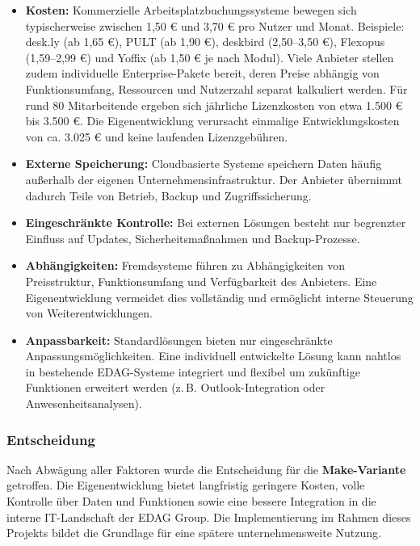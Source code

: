 \documentclass[11pt,a4paper]{report}
\begin{document}
\begin{itemize}
    \item \textbf{Kosten:} 
          Kommerzielle Arbeitsplatzbuchungssysteme bewegen sich typischerweise 
          zwischen 1,50 € und 3,70 € pro Nutzer und Monat.  
          Beispiele: desk.ly (ab 1,65 €), PULT (ab 1,90 €), deskbird (2,50–3,50 €), 
          Flexopus (1,59–2,99 €) und Yoffix (ab 1,50 € je nach Modul).  
          Viele Anbieter stellen zudem individuelle Enterprise-Pakete bereit, deren Preise 
          abhängig von Funktionsumfang, Ressourcen und Nutzerzahl separat kalkuliert werden.  
          Für rund 80 Mitarbeitende ergeben sich jährliche Lizenzkosten von etwa 
          1.500 € bis 3.500 €. Die Eigenentwicklung verursacht einmalige 
          Entwicklungskosten von ca. 3.025 € und keine laufenden Lizenzgebühren.

    \item \textbf{Externe Speicherung:} 
          Cloudbasierte Systeme speichern Daten häufig außerhalb der eigenen 
          Unternehmensinfrastruktur. Der Anbieter übernimmt dadurch Teile von Betrieb, 
          Backup und Zugriffssicherung.

    \item \textbf{Eingeschränkte Kontrolle:} 
          Bei externen Lösungen besteht nur begrenzter Einfluss auf Updates, 
          Sicherheitsmaßnahmen und Backup-Prozesse.

    \item \textbf{Abhängigkeiten:} 
          Fremdsysteme führen zu Abhängigkeiten von Preisstruktur, Funktionsumfang 
          und Verfügbarkeit des Anbieters. Eine Eigenentwicklung vermeidet dies vollständig 
          und ermöglicht interne Steuerung von Weiterentwicklungen.

    \item \textbf{Anpassbarkeit:} 
          Standardlösungen bieten nur eingeschränkte Anpassungsmöglichkeiten. 
          Eine individuell entwickelte Lösung kann nahtlos in bestehende EDAG-Systeme 
          integriert und flexibel um zukünftige Funktionen erweitert werden 
          (z.\,B. Outlook-Integration oder Anwesenheitsanalysen).
\end{itemize}


\subsubsection*{Entscheidung}

Nach Abwägung aller Faktoren wurde die Entscheidung für die \textbf{Make-Variante} getroffen.  
Die Eigenentwicklung bietet langfristig geringere Kosten, volle Kontrolle über Daten und Funktionen 
sowie eine bessere Integration in die interne IT-Landschaft der EDAG Group.  
Die Implementierung im Rahmen dieses Projekts bildet die Grundlage für eine spätere unternehmensweite Nutzung.
\end{document}
